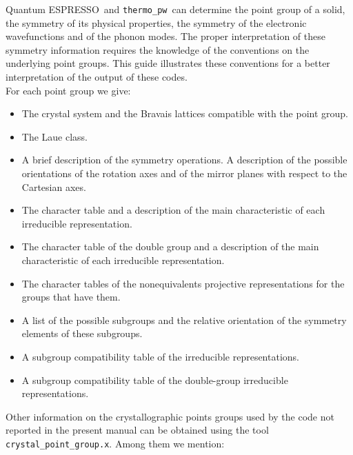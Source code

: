 \documentclass[12pt,a4paper,twoside]{report}
\def\qe{{\sc Quantum ESPRESSO}}
\def\tpw{\texttt{thermo\_pw}}
\begin{document}
\qe\ and \tpw\ can determine the point group of a
solid, the symmetry of its physical properties, the symmetry
of the electronic wavefunctions and of the phonon modes. The proper interpretation
of these symmetry information requires the knowledge of the conventions on the 
underlying point groups. This guide illustrates these conventions
for a better interpretation of the output of these codes. \\
For each point group we give: 
\begin{itemize}

\item
The crystal system and the Bravais lattices compatible with the point
group.

\item
The Laue class.

\item
A brief description of the symmetry operations. 
A description of the possible orientations of the rotation axes and of the 
mirror planes with respect to the Cartesian axes.

\item
The character table and a description of the main characteristic of each 
irreducible representation.

\item
The character table of the double group and a description of the main 
characteristic of each irreducible representation.

\item
The character tables of the nonequivalents projective representations for the 
groups that have them.

\item
A list of the possible subgroups and the relative orientation of the symmetry
elements of these subgroups.

\item
A subgroup compatibility table of the irreducible representations.

\item
A subgroup compatibility table of the double-group irreducible representations. 

\end{itemize}
Other information on the crystallographic points groups used by the code 
not reported in the present manual can be obtained using the tool 
\texttt{crystal\_point\_group.x}. Among them we mention:
\end{document}
